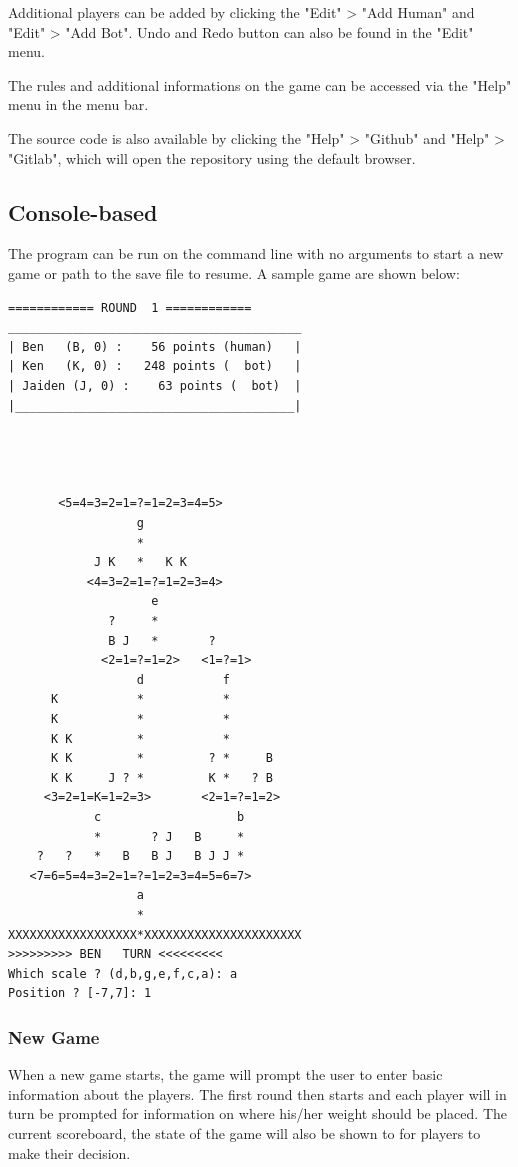 \documentclass[12pt]{article}
\begin{document}
Additional players can be added by clicking the "Edit" > "Add Human" and "Edit"
> "Add Bot". Undo and Redo button can also be found in the "Edit" menu.

The rules and additional informations on the game can be accessed via the "Help"
menu in the menu bar.


The source code is also available by clicking the "Help" > "Github" and "Help" >
"Gitlab", which will open the repository using the default browser.

\subsection{Console-based}
The program can be run on the command line with no arguments to start a new game
or path to the save file to resume. A sample game are shown below:


\begin{verbatim}
============ ROUND  1 ============
_________________________________________
| Ben   (B, 0) :    56 points (human)   |
| Ken   (K, 0) :   248 points (  bot)   |
| Jaiden (J, 0) :    63 points (  bot)  |
|_______________________________________|




       <5=4=3=2=1=?=1=2=3=4=5>
                  g
                  *
            J K   *   K K
           <4=3=2=1=?=1=2=3=4>
                    e
              ?     *
              B J   *       ?
             <2=1=?=1=2>   <1=?=1>
                  d           f
      K           *           *
      K           *           *
      K K         *           *
      K K         *         ? *     B
      K K     J ? *         K *   ? B
     <3=2=1=K=1=2=3>       <2=1=?=1=2>
            c                   b
            *       ? J   B     *
    ?   ?   *   B   B J   B J J *
   <7=6=5=4=3=2=1=?=1=2=3=4=5=6=7>
                  a
                  *
XXXXXXXXXXXXXXXXXX*XXXXXXXXXXXXXXXXXXXXXX
>>>>>>>>> BEN   TURN <<<<<<<<<
Which scale ? (d,b,g,e,f,c,a): a
Position ? [-7,7]: 1
\end{verbatim}


\subsubsection{New Game}

When a new game starts, the game will prompt the user to enter basic information
about the players. The first round then starts and each player will in turn be
prompted for information on where his/her weight should be placed. The current
scoreboard, the state of the game will also be shown to for players to make
their decision.
\end{document}
